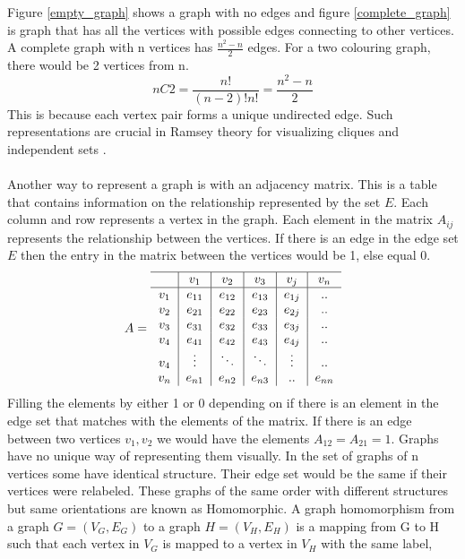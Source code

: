 \documentclass{Assignment}
\begin{document}
Figure \ref{empty_graph} shows a graph with no edges and figure \ref{complete_graph} is graph that has all the vertices with possible edges connecting to other vertices.
A complete graph with n vertices has ${\frac{n^2-n}{2}}$ edges.
For a two colouring graph, there would be 2 vertices from n. 
$$n C 2 =\frac{n!}{(n-2)!n!}= {\frac{n^2-n}{2}}$$
This is because each vertex pair forms a unique undirected edge.
Such representations are crucial in Ramsey theory for visualizing cliques and independent sets \cite{BondyMurty2008}.
\\\\
Another way to represent a graph is with an adjacency matrix.
This is a table that contains information on the relationship represented by the set $ E$.
Each column and row represents a vertex in the graph.
Each element in the matrix $A_{ij}$ represents the relationship between the vertices.
If there is an edge in the edge set $E$ then the entry in the matrix between the vertices would be 1, else equal 0.
\begin{equation}
	A=	\begin{tabular}{c|c|c|c|c|c}\hline
		&$v_1$&$v_2$&$v_3$&$v_j$&$v_n$\\\hline
		$v_1$&$e_{11}$&$e_{12}$&$e_{13}$&$e_{1j}$&..\\
		$v_2$&$e_{21}$&$e_{22}$&$e_{23}$&$e_{2j}$&..\\
		$v_3$&$e_{31}$&$e_{32}$&$e_{33}$&$e_{3j}$&..\\
		$v_4$&$e_{41}$&$e_{42}$&$e_{43}$&$e_{4j}$&..\\
		$v_4$&$\vdots$&$\ddots$&$\ddots$&$\vdots$&..\\
		$v_n$&$e_{n1}$&$e_{n2}$&$e_{n3}$&..&$e_{nn}$\\
	\end{tabular}
\end{equation}
Filling the elements by either 1 or 0 depending on if there is an element in the edge set that matches with the elements of the matrix.
If there is an edge between two vertices $v_1 ,v_2$ we would have the elements $A_{12} = A_{21}=1$. 
Graphs have no unique way of representing them visually.
In the set of graphs of n vertices some have identical structure.
Their edge set would be the same if their vertices were relabeled.
These graphs of the same order with different structures but same orientations are known as Homomorphic. 
A graph homomorphism from a graph $G = (V_G,E_G)$ to a graph $H =(V_H,E_H)$
is a mapping from G to H such that each vertex in
$V_G$ is mapped to a vertex in $V_H$ with the same label,
\end{document}
